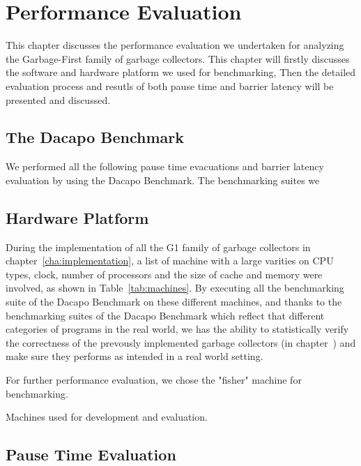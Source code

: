 \chapter{Performance Evaluation}
\label{cha:evaluation}

This chapter discusses the performance evaluation we undertaken for analyzing
the Garbage-First family of garbage collectors.
This chapter will firstly discusses the software and hardware platform we used for benchmarking,
Then the detailed evaluation process and resutls of both pause time and
barrier latency will be presented and discussed.


\section{The Dacapo Benchmark} %

We performed all the following pause time evacuations and barrier latency evaluation
by using the Dacapo Benchmark. The benchmarking suites we 

\section{Hardware Platform} %

During the implementation of all the G1 family of garbage collectors in chapter~\ref{cha:implementation},
a list of machine with a large varities on CPU types, clock, number of processors and
the size of cache and memory were involved, as shown in Table~\ref{tab:machines}.
By executing all the benchmarking suite of the Dacapo Benchmark on these different machines,
and thanks to the benchmarking suites of the Dacapo Benchmark which reflect
that different categories of programs in the real world,
we has the ability to statistically verify the correctness of the prevously
implemented garbage collectors (in chapter~\label{cha:implementation})
and make sure they performs as intended in a real world setting.

For further performance evaluation, we chose the "fisher" machine for benchmarking.

\begin{table*}
  \centering
  \label{tab:machines}
  
  \caption{Machines used for development and evaluation.}
\end{table*}

\section{Pause Time Evaluation} %
\label{sec:pausetimeevaluation}
